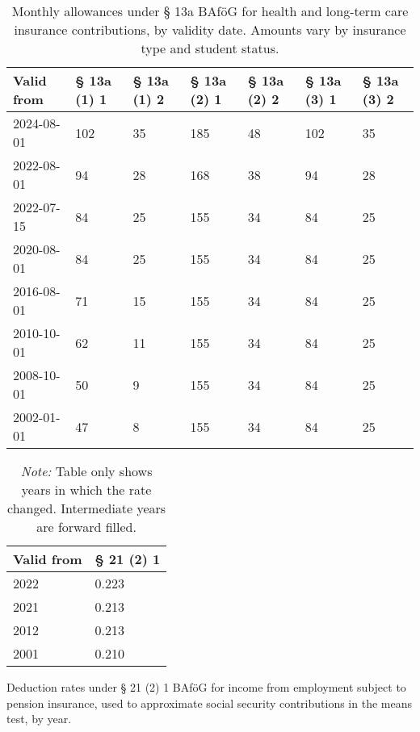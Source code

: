 \vspace{1em}

\begin{table}[H]
\centering
\small
\begin{tabularx}{\textwidth}{lXXXXXX}
\toprule
\textbf{Valid from} & \textbf{§ 13a (1) 1} & \textbf{§ 13a (1) 2} & \textbf{§ 13a (2) 1} & \textbf{§ 13a (2) 2} & \textbf{§ 13a (3) 1} & \textbf{§ 13a (3) 2} \\
\midrule
2024-08-01 & 102 & 35 & 185 & 48 & 102 & 35 \\
2022-08-01 & 94  & 28 & 168 & 38 & 94  & 28 \\
2022-07-15 & 84  & 25 & 155 & 34 & 84  & 25 \\
2020-08-01 & 84  & 25 & 155 & 34 & 84  & 25 \\
2016-08-01 & 71  & 15 & 155 & 34 & 84  & 25 \\
2010-10-01 & 62  & 11 & 155 & 34 & 84  & 25 \\
2008-10-01 & 50  & 9  & 155 & 34 & 84  & 25 \\
2002-01-01 & 47  & 8  & 155 & 34 & 84  & 25 \\
\bottomrule
\end{tabularx}
\caption{Monthly allowances under § 13a BAföG for health and long-term care insurance contributions, by validity date. Amounts vary by insurance type and student status.}
\label{tab:bafog_values_13a}
\end{table}

\vspace{1em}

\begin{table}[H]
\centering
\small
\begin{tabularx}{\textwidth}{lX}
\toprule
\textbf{Valid from} & \textbf{§ 21 (2) 1} \\
\midrule
2022 & 0.223 \\
2021 & 0.213 \\
2012 & 0.213 \\
2001 & 0.210 \\
\bottomrule
\end{tabularx}
\caption{Deduction rates under § 21 (2) 1 BAföG for income from employment subject to pension insurance, used to approximate social security contributions in the means test, by year.}
\caption*{\textit{Note:} Table only shows years in which the rate changed. Intermediate years are forward filled.}
\end{table}

\vspace{1em}

